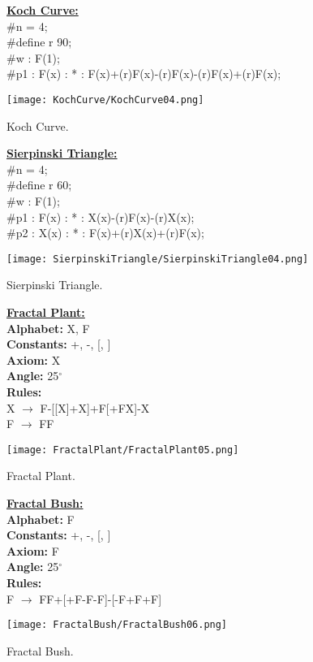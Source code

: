 \begin{figure}[htbp]
	\raggedright
	\textbf{\underline{Koch Curve:}} \\
	\#n = 4; \\
	\#define r 90; \\
	\#w : F(1); \\
	\#p1 : F(x) : * : F(x)+(r)F(x)-(r)F(x)-(r)F(x)+(r)F(x);\\
	{\centering
		\vspace{7px}
		\texttt{[image: KochCurve/KochCurve04.png]}
		\caption{Koch Curve.}
	}
\end{figure}
\begin{figure}[htbp]
	\raggedright
	\textbf{\underline{Sierpinski Triangle:}} \\
	\#n = 4;\\
	\#define r 60;\\
	\#w : F(1);\\
	\#p1 : F(x) : * : X(x)-(r)F(x)-(r)X(x);\\
	\#p2 : X(x) : * : F(x)+(r)X(x)+(r)F(x);\\
	{\centering
		\vspace{7px}
		\texttt{[image: SierpinskiTriangle/SierpinskiTriangle04.png]}
		\caption{Sierpinski Triangle.}
	}
\end{figure}
\begin{figure}[htbp]
	\raggedright
	\textbf{\underline{Fractal Plant:}} \\
	\textbf{Alphabet:} X, F\\
	\textbf{Constants:} +, -, [, ] \\
	\textbf{Axiom:} X \\
	\textbf{Angle:} 25$^\circ$ \\
	\textbf{Rules:} \\
	X $\rightarrow$ F-[[X]+X]+F[+FX]-X\\
	F $\rightarrow$ FF \\
	{\centering
		\vspace{7px}
		\texttt{[image: FractalPlant/FractalPlant05.png]}
		\caption{Fractal Plant.}
	}
\end{figure}
\begin{figure}[htbp]
	\raggedright
	\textbf{\underline{Fractal Bush:}} \\
	\textbf{Alphabet:} F\\
	\textbf{Constants:} +, -, [, ] \\
	\textbf{Axiom:} F \\
	\textbf{Angle:} 25$^\circ$ \\
	\textbf{Rules:} \\
	F $\rightarrow$ FF+[+F-F-F]-[-F+F+F]\\
	{\centering
		\vspace{7px}
		\texttt{[image: FractalBush/FractalBush06.png]}
		\caption{Fractal Bush.}
	}
\end{figure}

